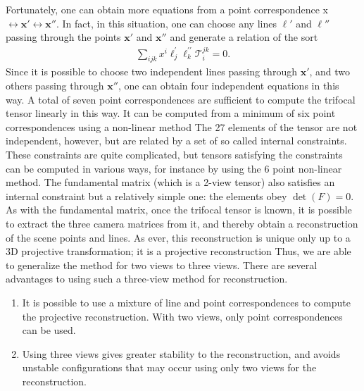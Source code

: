 \documentclass{report}
\begin{document}
\begin{itemize}
            \bigbreak \noindent 
            Fortunately, one can obtain more equations from a point correspondence x $\leftrightarrow \mathbf{x}'\leftrightarrow \mathbf{x}''$. In fact, in this situation, one can choose any lines $\mathbf{\ell}'$ and $\ell''$ passing through the points $\mathbf{x}'$ and $\mathbf{x}''$ and generate a relation of the sort
            \begin{align*}
                \sum_{ijk} x^{i}\mathbf{\ell}_{j}^{\prime}\ell_{k}^{\prime\prime}\mathcal{T}_{i}^{jk} = 0
            .\end{align*}
            Since it is possible to choose two independent lines passing through $\mathbf{x}'$, and two others passing through $\mathbf{x}''$, one can obtain four independent equations in this way. A total of seven point correspondences are sufficient to compute the trifocal tensor linearly in this way. It can be computed from a minimum of six point correspondences using a non-linear method
            \bigbreak \noindent 
            The 27 elements of the tensor are not independent, however, but are related by a set of so called internal constraints. These constraints are quite complicated, but tensors satisfying the constraints can be computed in various ways, for instance by using the 6 point non-linear method. The fundamental matrix (which is a 2-view tensor) also satisfies an internal constraint but a relatively simple one: the elements obey $\det(F) = 0$.
            \bigbreak \noindent 
            As with the fundamental matrix, once the trifocal tensor is known, it is possible to extract the three camera matrices from it, and thereby obtain a reconstruction of the scene points and lines. As ever, this reconstruction is unique only up to a 3D projective transformation; it is a projective reconstruction
            \bigbreak \noindent 
            Thus, we are able to generalize the method for two views to three views. There are several advantages to using such a three-view method for reconstruction.
            \begin{enumerate}[label=(\roman*)]
                \item It is possible to use a mixture of line and point correspondences to compute the projective reconstruction. With two views, only point correspondences can be used.
                \item Using three views gives greater stability to the reconstruction, and avoids unstable configurations that may occur using only two views for the reconstruction.
            \end{enumerate}

\end{itemize}
\end{document}
